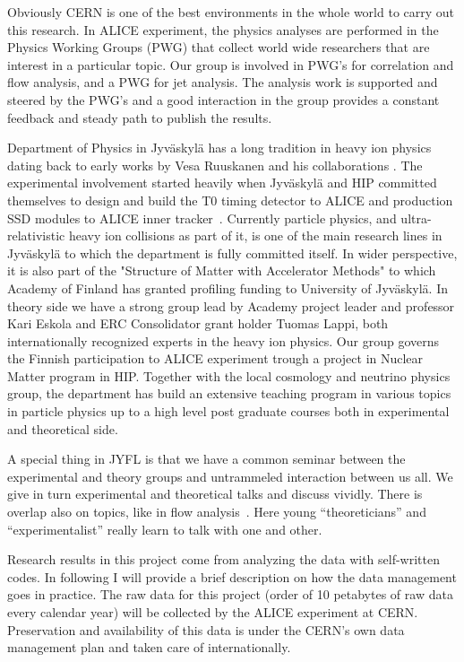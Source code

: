 Obviously CERN is one of the best environments in the whole world to carry out this research. In ALICE experiment, the physics analyses are performed in the Physics Working Groups (PWG) that collect world wide researchers that are interest in a particular topic. Our group is involved in PWG's for correlation and flow analysis, and a PWG for jet analysis. The analysis work is supported and steered by the PWG's and a good interaction in the group provides a constant feedback and steady path to publish the results.

Department of Physics in Jyv\"askyl\"a has a long tradition in heavy ion physics dating back to early works by Vesa Ruuskanen and his collaborations \cite{VonGersdorff:1986tqh}. The experimental involvement started heavily when Jyv\"askyl\"a and HIP committed themselves to design and build the T0 timing detector to ALICE and production SSD modules to ALICE inner tracker~\cite{Dellacasa:1999kf}. Currently particle physics, and ultra-relativistic heavy ion collisions as part of it, is one of the main research lines in Jyv\"askyl\"a to which the department is fully committed itself. In wider perspective, it is also part of the "Structure of Matter with Accelerator Methods" to which Academy of Finland has granted profiling funding to University of Jyv\"askyl\"a. In theory side we have a strong group lead by Academy project leader and professor Kari Eskola and ERC Consolidator grant holder Tuomas Lappi, both internationally recognized experts in the heavy ion physics. Our group governs the Finnish participation to ALICE experiment trough a project in Nuclear Matter program in HIP. Together with the local cosmology and neutrino physics group, the department has build an extensive teaching program in various topics in particle physics up to a high level post graduate courses both in experimental and theoretical side.

A special thing in JYFL is that we have a common seminar between the experimental and theory groups and untrammeled interaction between us all. We give in turn experimental and theoretical talks and discuss vividly. There is overlap also on topics, like in flow analysis~\cite{Niemi:2015qia}. Here young ``theoreticians'' and ``experimentalist'' really learn to talk with one and other.

Research results in this project come from analyzing the data with self-written codes. In following I will provide a brief description on how the data management goes in practice.  The raw data for this project (order of 10 petabytes of raw data every calendar year) will be collected by the ALICE experiment at CERN. Preservation and availability of this data is under the CERN's own data management plan and taken care of internationally.

